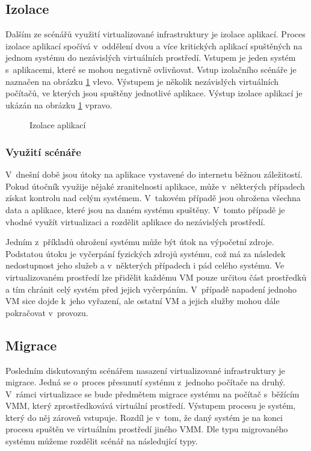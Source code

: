 \subsection{Izolace}
\label{chapter:virtualization:deployment:isolation}
Dalším ze scénářů využití virtualizované infrastruktury je izolace aplikací. Proces izolace aplikací spočívá v~oddělení dvou
a více kritických aplikací spuštěných na jednom systému do nezávislých virtuálních prostředí. Vstupem je jeden systém
s~aplikacemi, které se mohou negativně ovlivňovat. Vstup izolačního scénáře je naznačen na obrázku \ref{figure:isolation} vlevo.
Výstupem je několik nezávislých virtuálních počítačů, ve kterých jsou spuštěny jednotlivé aplikace. Výstup izolace aplikací
je ukázán na obrázku \ref{figure:isolation} vpravo.
\begin{figure}
    \centering    
    \caption{Izolace aplikací}
    \label{figure:isolation}
\end{figure}
\subsubsection{Využití scénáře}
\label{chapter:virtualization:deployment:isolation:use}
V~dnešní době jsou útoky na aplikace vystavené do internetu běžnou záležitostí. Pokud útočník využije nějaké zranitelnosti 
aplikace, může v~některých případech získat kontrolu nad celým systémem. V~takovém případě jsou ohrožena všechna data a 
aplikace, které jsou na daném systému spuštěny. V~tomto případě je vhodné využít virtualizaci a rozdělit aplikace do nezávislých
prostředí.

Jedním z~příkladů ohrožení systému může být útok na výpočetní zdroje. Podstatou útoku je vyčerpání fyzických zdrojů systému,
což má za následek nedostupnost jeho služeb a v~některých případech i pád celého systému. Ve virtualizovaném prostředí lze
přidělit každému VM pouze určitou část prostředků a tím chránit celý systém před jejich vyčerpáním. V~případě napadení jednoho
VM sice dojde k~jeho vyřazení, ale ostatní VM a jejich služby mohou dále pokračovat v~provozu.
\subsection{Migrace}
\label{chapter:virtualization:deployment:migration}
Posledním diskutovaným scénářem nasazení virtualizované infrastruktury je migrace. Jedná se o~proces přesunutí systému z~jednoho
počítače na druhý. V~rámci virtualizace se bude předmětem migrace systému na počítač s~běžícím VMM, který zprostředkovává
virtuální prostředí. Výstupem procesu je systém, který do něj zároveň vstupuje. Rozdíl je v~tom, že daný systém je na konci procesu
spuštěn ve virtuálním prostředí jiného VMM. Dle typu migrovaného systému můžeme rozdělit scénář na následující typy.

